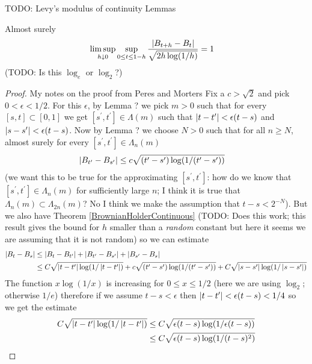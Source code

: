 TODO: Levy's modulus of continuity Lemmas
\begin{thm}Almost surely 
\begin{align*}
\limsup_{h \downarrow 0} \sup_{0 \leq t \leq 1-h} \frac{\left \vert B_{t+h} -
    B_t \right \vert}{\sqrt{2h\log(1/h)}} &= 1
\end{align*}
(TODO: Is this $\log_e$ or $\log_2$?)
\end{thm}
\begin{proof}
My notes on the proof from Peres and Morters
Fix a $c > \sqrt{2}$ and pick $0 < \epsilon < 1/2$.  For this $\epsilon$,
by Lemma ? we pick $m>0$ such that for every $[s,t] \subset [0,1]$ we
get $[s^\prime,t^\prime] \in \Lambda(m)$ such that $\left \vert t - t^\prime \right \vert
< \epsilon (t -s)$ and  $\left \vert s - s^\prime \right \vert
< \epsilon (t -s)$.  Now by Lemma ? we choose $N > 0$ such that for
all $n \geq N$, almost surely for every $[s^\prime, t^\prime] \in
\Lambda_n(m)$
\begin{align*}
\left \vert B_{t^\prime} - B_{s^\prime} \right \vert &\leq c \sqrt{(t^\prime - s^\prime)
  \log(1/(t^\prime -s^\prime))}
\end{align*}
(we want this to be true for the approximating $[s^\prime, t^\prime]$:
how do we know that $[s^\prime, t^\prime] \in \Lambda_n(m)$ for
sufficiently large $n$; I think it is true that $\Lambda_n(m) \subset
\Lambda_{2n}(m)$?  No I think we make the assumption that $t-s < 2^{-N}$).
But we also have Theorem \ref{BrownianHolderContinuous} (TODO: Does
this work; this result gives the bound for $h$ smaller than a
\emph{random} constant but here it seems we are assuming that it is
not random) so we can
estimate
\begin{align*}
\left \vert B_{t} - B_{s} \right \vert &\leq \left \vert B_{t} -
  B_{t^\prime} \right \vert + \left \vert B_{t^\prime} - B_{s^\prime} \right \vert +
\left \vert B_{s^\prime} - B_{s} \right \vert \\
&\leq C \sqrt{\left \vert t - t^\prime \right \vert \log(1/\left \vert t - t^\prime \right \vert)} + 
c \sqrt{(t^\prime - s^\prime)  \log(1/(t^\prime -s^\prime))} +
C \sqrt{\left \vert s - s^\prime \right \vert \log(1/\left \vert s - s^\prime \right \vert)}
\end{align*}
The function $x \log(1/x)$ is increasing for $0\leq x \leq 1/2$ (here
we are using $\log_2$; otherwise $1/e$) therefore if we assume $t -s <
\epsilon$ then $\left \vert t - t^\prime \right \vert < \epsilon (t-s) < 1/4$ so we get
the estimate
\begin{align*}
C \sqrt{\abs{t - t^\prime} \log(1/\abs{t - t^\prime})} &\leq C
\sqrt{\epsilon(t-s)\log(1/\epsilon(t-s))} \\
&\leq C\sqrt{\epsilon(t-s)\log(1/(t-s)^2)} \\

\end{align*}
\end{proof}

